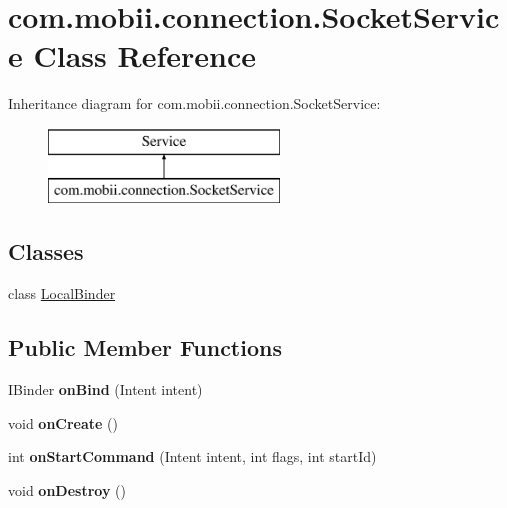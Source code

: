 \hypertarget{classcom_1_1mobii_1_1connection_1_1_socket_service}{\section{com.\-mobii.\-connection.\-Socket\-Service Class Reference}
\label{classcom_1_1mobii_1_1connection_1_1_socket_service}
}
Inheritance diagram for com.\-mobii.\-connection.\-Socket\-Service\-:\begin{figure}[H]
\begin{center}
\leavevmode
\includegraphics[height=2.000000cm]{classcom_1_1mobii_1_1connection_1_1_socket_service}
\end{center}
\end{figure}
\subsection*{Classes}
\begin{DoxyCompactItemize}
\item 
class \hyperlink{classcom_1_1mobii_1_1connection_1_1_socket_service_1_1_local_binder}{Local\-Binder}
\end{DoxyCompactItemize}
\subsection*{Public Member Functions}
\begin{DoxyCompactItemize}
\item 
\hypertarget{classcom_1_1mobii_1_1connection_1_1_socket_service_a3e087d18026a47adc3d42f3f2e9bc077}{I\-Binder {\bfseries on\-Bind} (Intent intent)}\label{classcom_1_1mobii_1_1connection_1_1_socket_service_a3e087d18026a47adc3d42f3f2e9bc077}

\item 
\hypertarget{classcom_1_1mobii_1_1connection_1_1_socket_service_a0a4d2e41bc8496b7d654d236d492a531}{void {\bfseries on\-Create} ()}\label{classcom_1_1mobii_1_1connection_1_1_socket_service_a0a4d2e41bc8496b7d654d236d492a531}

\item 
\hypertarget{classcom_1_1mobii_1_1connection_1_1_socket_service_a2765013217604ca640478bb36cd4d828}{int {\bfseries on\-Start\-Command} (Intent intent, int flags, int start\-Id)}\label{classcom_1_1mobii_1_1connection_1_1_socket_service_a2765013217604ca640478bb36cd4d828}

\item 
\hypertarget{classcom_1_1mobii_1_1connection_1_1_socket_service_a96fcad79cc774add19ee72fec6d72549}{void {\bfseries on\-Destroy} ()}\label{classcom_1_1mobii_1_1connection_1_1_socket_service_a96fcad79cc774add19ee72fec6d72549}

\end{DoxyCompactItemize}
